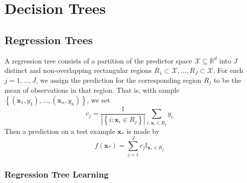 \documentclass[11pt]{report} %
\begin{document}
\section{Decision Trees \cite{James2013}}

\subsection{Regression Trees}

A regression tree consists of a partition of the predictor space $\mathcal{X} \subseteq \mathbb{R}^{d}$ into $J$ distinct and non-overlapping rectangular regions $R_{1} \subset \mathcal{X}, \dots, R_{J} \subset \mathcal{X}$. For each $j = 1, \dots, J$, we assign the prediction for the corresponding region $R_{j}$ to be the mean of observations in that region. That is, with sample $\left\{\left(\mathbf{x}_{1}, y_{1}\right), \dots, \left(\mathbf{x}_{n}, y_{n}\right)\right\}$, we set
\begin{equation}
c_{j} = \dfrac{1}{\left|\left\{i: \mathbf{x}_{i} \in R_{j}\right\}\right|}\sum_{i: \mathbf{x}_{i} \in R_{j}}y_{i}
\end{equation}
Then a prediction on a test example $\mathbf{x}_{*}$ is made by
\begin{equation}
f\left(\mathbf{x}_{*}\right) = \sum_{j = 1}^{J}c_{j}\mathbb{I}_{\mathbf{x}_{*} \in R_{j}}
\end{equation}

\subsubsection{Regression Tree Learning}
\end{document}
